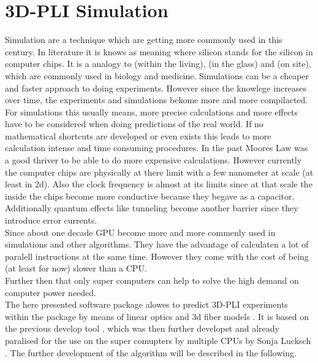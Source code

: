 \setcounter{chapter}{5}
\chapter{\acs{3D-PLI} Simulation}
\label{cha:simulation}
% 
Simulation are a technique which are getting more commonly used in this century.
In literature it is knows as  meaning  where silicon stands for the silicon in computer chips.
It is a analogy to  (within the living),  (in the glass) and  (on site), which are commonly used in biology and medicine.
Simulations can be a cheaper and faster approach to doing experiments.
However since the knowlege increases over time, the experiments and simulations bekome more and more compilacted.
For simulations this usually means, more precise calculations and more effects have to be considered when doing predictions of the real world.
If no mathematical shortcuts are developed or even exists this leads to more calculation intense and time consuming procedures.
In the past Moores Law was a good thriver to be able to do more expensive calculations.
However currently the computer chips are physically at there limit with a few nanometer at scale (at least in 2d).
Also the clock frequency is almost at its limits since at that scale the  inside the chips become more conductive because they begave as a capacitor.
Additionally quantum effects like tunneling become another barrier since they introduce error currents.
\\
% 
Since about one decade \acs{GPU} become more and more commenly used in simulations and other algorithms.
They have the advantage of calculaten a lot of paralell instructions at the same time.
However they come with the cost of being (at least for now) slower than a \ac{CPU}.
\\
% 
Further then that only super computers can help to solve the high demand on computer power needed.
\\[\baselineskip]
% 
The here presented \fastpli{} software package alowes to predict \ac{3D-PLI} experiments within the \python package  by means of linear optics \cite{} and 3d fiber models \cite{}.
It is based on the previous develop tool \simpli{} \cite{Dohmen2015}, which was then further developet and already paralised for the use on the super comupters by multiple \acp{CPU} by Sonja Lucksch \cite{Lucksch2016}.
%
The further development of the algorithm will be described in the following.
\\[\baselineskip]
